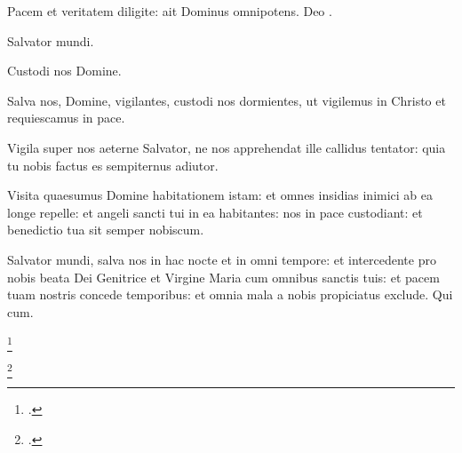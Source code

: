 

Pacem et veritatem diligite: ait Dominus omnipotens.
Deo .

 Salvator mundi.

 Custodi nos Domine.

Salva nos, Domine, vigilantes,
custodi nos dormientes,
ut vigilemus in Christo
et requiescamus in pace.


Vigila super nos aeterne Salvator,
ne nos apprehendat ille callidus tentator:
quia tu nobis factus es sempiternus adiutor.

Visita quaesumus Domine habitationem istam:
et omnes insidias inimici ab ea longe repelle:
et angeli sancti tui in ea habitantes:
nos in pace custodiant:
et benedictio tua sit semper nobiscum.

Salvator mundi, salva nos in hac nocte et in omni tempore:
et intercedente pro nobis beata Dei Genitrice et Virgine Maria
cum omnibus sanctis tuis:
et pacem tuam nostris concede temporibus:
et omnia mala a nobis propiciatus exclude.
Qui cum.

\footcite[121r]{bp1502}

\headingCantus


\footcite[81r]{xv_a_10}

